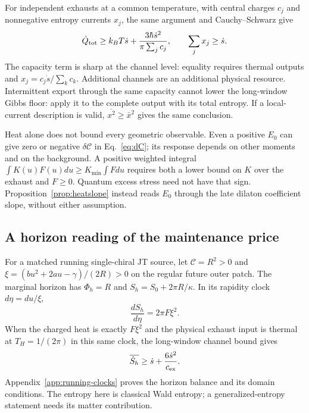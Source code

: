 For independent exhausts at a common temperature, with central charges $c_j$
and nonnegative entropy currents $x_j$, the same argument and Cauchy--Schwarz give
\begin{equation}\label{eq:parallel-exhaust}
 \dot Q_{\rm tot}\ge k_BT\dot s+
 \frac{3\hbar\dot s^2}{\pi\sum_jc_j},\qquad \sum_jx_j\ge\dot s.
\end{equation}
The capacity term is sharp at the channel level: equality requires thermal outputs
and $x_j=c_j\dot s/\sum_kc_k$. Additional channels are an additional physical
resource. Intermittent export through the same capacity cannot lower the
long-window Gibbs floor: apply it to the complete output with its total entropy.
If a local-current description is valid, $\overline{x^2}\ge\bar x^2$ gives the
same conclusion.

Heat alone does not bound every geometric observable. Even a positive $E_0$ can
give zero or negative $\delta\mathcal C$ in Eq.~\eqref{eq:dC}; its response depends
on other moments and on the background. A positive weighted integral
$\int K(u)F(u)du\ge K_{\min}\int Fdu$ requires both a lower bound on $K$ over
the exhaust and $F\ge0$. Quantum excess stress need not have that sign.
Proposition~\ref{prop:heatslope} instead reads $E_0$ through the late
dilaton coefficient slope, without either assumption.

\subsection{A horizon reading of the maintenance price}

For a matched running single-chiral JT source, let
$\mathcal C=R^2>0$ and
$\xi=(bu^2+2au-\gamma)/(2R)>0$ on the regular future outer patch.
The marginal horizon has $\Phi_h=R$ and
$S_h=S_0+2\pi R/\kappa$. In its rapidity clock $d\eta=du/\xi$,
\[
 \frac{dS_h}{d\eta}=2\pi F\xi^2.
\]
When the charged heat is exactly $F\xi^2$ and the physical exhaust
input is thermal at $T_H=1/(2\pi)$ in this same clock, the
long-window channel bound gives
\[
 \overline{\dot S_h}\ge\dot s+\frac{6\dot s^2}{c_{\rm ex}}.
\]
Appendix~\ref{app:running-clocks} proves the horizon balance and its
domain conditions. The entropy here is classical Wald entropy; a
generalized-entropy statement needs its matter contribution.

